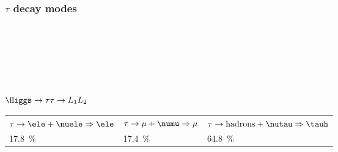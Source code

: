 \begin{frame}
\frametitle{$\tau$ decay modes}
~\hfill
\pause
\hfill
\pause
\hfill~

\vspace{5\baselineskip}

~\hfill

\hfill

\hfill~
\end{frame}

\begin{frame}
\frametitle{$\Higgs\to\tau\tau\to L_1L_2$}

\begin{tabularx}{\linewidth}{YYY}
$\tau\to\ele+\nuele\Rightarrow\ele$ & $\tau\to\mu+\numu\Rightarrow\mu$ & $\tau\to\text{hadrons}+\nutau\Rightarrow\tauh$\\
\SI{17.8}{\%} & \SI{17.4}{\%} & \SI{64.8}{\%}
\end{tabularx}

\pause
\vspace{\baselineskip}

\begin{minipage}[c]{.45\textwidth}
\begin{center}

\end{center}
\end{minipage}
\hfill\pause
\begin{minipage}[c]{.45\textwidth}
\begin{center}

\end{center}
\end{minipage}

\end{frame}
